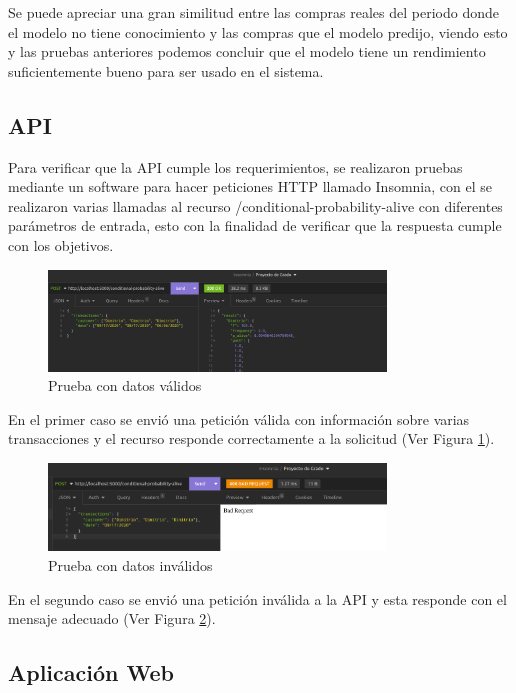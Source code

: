 Se puede apreciar una gran similitud entre las compras reales del periodo donde el modelo no tiene conocimiento y las compras que el modelo predijo, viendo esto y las pruebas anteriores podemos concluir que el modelo tiene un rendimiento suficientemente bueno para ser usado en el sistema.

\subsection{API}

Para verificar que la API cumple los requerimientos, se realizaron pruebas mediante un software para hacer peticiones HTTP llamado Insomnia, con el se realizaron varias llamadas al recurso /conditional-probability-alive con diferentes parámetros de entrada, esto con la finalidad de verificar que la respuesta cumple con los objetivos.

\begin{figure}[H]
	\centering \includegraphics[width=0.80\textwidth]{images/3.png}
	\caption{Prueba con datos válidos}
	\label{fig:api1}
\end{figure}

En el primer caso se envió una petición válida con información sobre varias transacciones y el recurso responde correctamente a la solicitud (Ver Figura \ref{fig:api1}).

\begin{figure}[H]
	\centering \includegraphics[width=0.80\textwidth]{images/4.png}
	\caption{Prueba con datos inválidos}
	\label{fig:api2}
\end{figure}

En el segundo caso se envió una petición inválida a la API y esta responde con el mensaje adecuado (Ver Figura \ref{fig:api2}).

\subsection{Aplicación Web}

